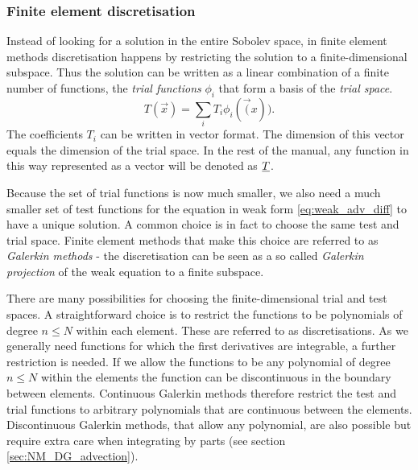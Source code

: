 \subsubsection{Finite element discretisation}
Instead of looking for a solution in the entire Sobolev space,
in finite element methods discretisation
happens by restricting the solution to a 
finite-dimensional subspace. Thus the solution can be 
written as a linear combination of a finite number of functions,
the \emph{trial functions} $\phi_i$ that form a basis of the 
\emph{trial space}.
\begin{equation*}
  T(\vec{x})=\sum_i T_i \phi_i(\vec(x)).
\end{equation*}
The coefficients $T_i$ can be written in vector format. The 
dimension of this vector equals the dimension of the trial 
space. In the rest of the manual, any function in 
this way represented as a vector will be denoted as $\underline{T}$.

Because the set of trial functions is now much smaller, we also need
a much smaller set of test functions for the equation in weak 
form \eqref{eq:weak_adv_diff} to have a unique 
solution. A common choice is in fact to choose the same
test and trial space. Finite element methods that make this choice are 
referred to as \emph{Galerkin methods} - the discretisation 
can be seen as a so called \emph{Galerkin 
projection} of the weak equation to a finite subspace.

There are many possibilities for choosing the finite-dimensional trial and test spaces. 
A straightforward choice is to restrict the functions to be polynomials of degree 
$n\leq N$ within each element. These are referred to as \PN discretisations. 
As we generally need functions for which the first 
derivatives are integrable, a further restriction 
is needed. If we allow the functions to be any polynomial of 
degree $n\leq N$ within the elements the function can be 
discontinuous in the boundary between elements. 
Continuous Galerkin methods therefore
restrict the test and trial functions to arbitrary polynomials 
that are continuous between the elements. Discontinuous Galerkin methods, 
that allow any polynomial, are also possible but require 
extra care when integrating by parts (see section \ref{sec:NM_DG_advection}).

